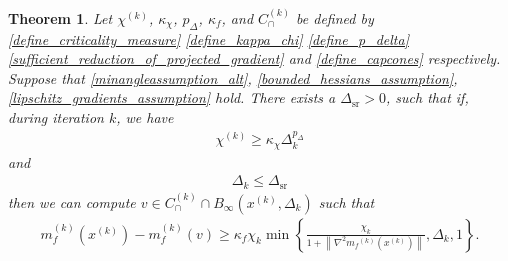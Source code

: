 \documentclass{article}
\newtheorem{theorem}{Theorem}[section]
\newtheorem{definition}[theorem]{Definition}
\newtheorem{lemma}[theorem]{Lemma}
\theoremstyle{case}
\numberwithin{theorem}{subsection}
\newcommand{\capcones}{{C^{(k)}_{\cap}}}
\newcommand{\chik}{{\chi^{(k)}}}
\newcommand{\dk}{\Delta_k}
\newcommand{\dsr}{{\Delta_{\textrm{sr}}}}
\newcommand{\feasiblek}{{\mathcal F_m^{(k)}}}
\newcommand{\gk}{{\nabla m_f^{(k)}\left(\xk\right)}}
\newcommand{\mfk}{{{m}_f}^{(k)}}
\newcommand{\tr}{{ B_{\infty}\left(\xk, \dk\right) }}
\newcommand{\xk}{x^{(k)}}
\begin{document}
% 





\begin{theorem}
\label{sufficient_reduction_theorem}
Let 
$\chik$,
$\kappa_{\chi}$,
$p_{\Delta}$,
$\kappa_f$,
and $\capcones$
be defined by
\cref{define_criticality_measure}
\cref{define_kappa_chi}
\cref{define_p_delta}
\cref{sufficient_reduction_of_projected_gradient}
and \cref{define_capcones}
respectively.
Suppose that
\cref{minangleassumption_alt},
\cref{bounded_hessians_assumption},
\cref{lipschitz_gradients_assumption}
hold.
There exists a $\dsr > 0$, such that if, during iteration $k$, we have
\begin{align}
\chik \ge \kappa_{\chi} \dk^{p_{\Delta}} \label{sr_chi_big_enough}
\end{align}
and
\begin{align}
\dk \le \dsr \label{sr_delta_small_enough}
\end{align}
then we can compute $v \in \capcones \cap \tr$ such that
\begin{align*}
m_f^{(k)}(\xk) - m_f^{(k)}(v)
\ge \kappa_f \chi_k \min\left\{ \frac{\chi_k}{1+\left\|\nabla^2 \mfk(\xk)\right\|}, \dk, 1 \right\}.
\end{align*}

\end{theorem}
\end{document}
